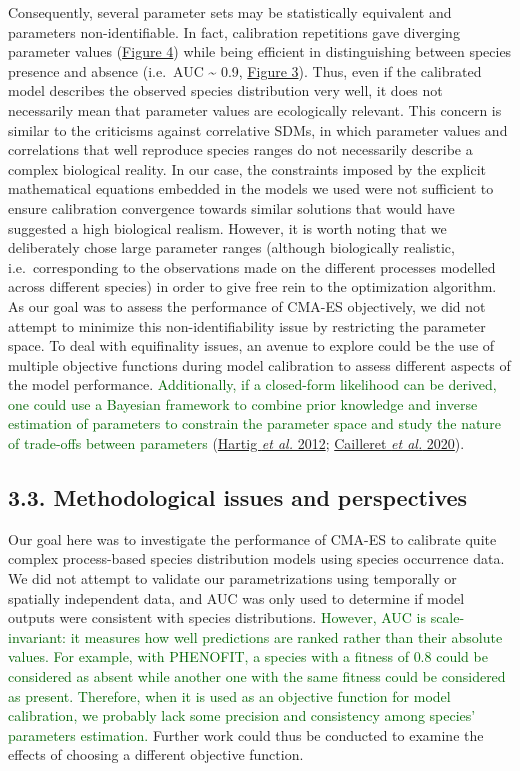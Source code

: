 \documentclass[11pt,]{article}
\begin{document}
Consequently, several parameter sets may be statistically equivalent and
parameters non-identifiable. In fact, calibration repetitions gave
diverging parameter values (\hyperref[fig:unfoldingplots]{Figure 4})
while being efficient in distinguishing between species presence and
absence (i.e.~AUC \textasciitilde{} 0.9,
\hyperref[fig:cmaesrepAUCcal]{Figure 3}). Thus, even if the calibrated
model describes the observed species distribution very well, it does not
necessarily mean that parameter values are ecologically relevant. This
concern is similar to the criticisms against correlative SDMs, in which
parameter values and correlations that well reproduce species ranges do
not necessarily describe a complex biological reality. In our case, the
constraints imposed by the explicit mathematical equations embedded in
the models we used were not sufficient to ensure calibration convergence
towards similar solutions that would have suggested a high biological
realism. However, it is worth noting that we deliberately chose large
parameter ranges (although biologically realistic, i.e.~corresponding to
the observations made on the different processes modelled across
different species) in order to give free rein to the optimization
algorithm. As our goal was to assess the performance of CMA-ES
objectively, we did not attempt to minimize this non-identifiability
issue by restricting the parameter space. To deal with equifinality
issues, an avenue to explore could be the use of multiple objective
functions during model calibration to assess different aspects of the
model performance.
\textcolor{darkgreen}{Additionally, if a closed-form likelihood can be derived, one could use a Bayesian framework to combine prior knowledge and inverse estimation of parameters to constrain the parameter space and study the nature of trade-offs between parameters}
(\protect\hyperlink{ref-Hartig2012}{Hartig \emph{et al.} 2012};
\protect\hyperlink{ref-Cailleret2020}{Cailleret \emph{et al.} 2020}).

\hypertarget{methodological-issues-and-perspectives}{%
\subsection{3.3. Methodological issues and
perspectives}\label{methodological-issues-and-perspectives}}

Our goal here was to investigate the performance of CMA-ES to calibrate
quite complex process-based species distribution models using species
occurrence data. We did not attempt to validate our parametrizations
using temporally or spatially independent data, and AUC was only used to
determine if model outputs were consistent with species distributions.
\textcolor{darkgreen}{However, AUC is scale-invariant: it measures how well predictions are ranked rather than their absolute values. For example, with PHENOFIT, a species with a fitness of $0.8$ could be considered as absent while another one with the same fitness could be considered as present. Therefore, when it is used as an objective function for model calibration, we probably lack some precision and consistency among species’ parameters estimation.}
Further work could thus be conducted to examine the effects of choosing
a different objective function.
\end{document}
